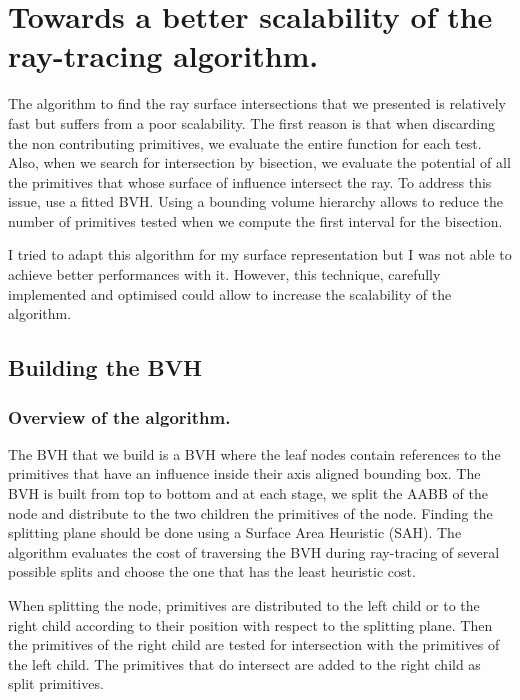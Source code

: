 \documentclass[11pt,a4paper,english]{article}
\begin{document}
\newpage

\appendix
\section{Towards a better scalability of the ray-tracing algorithm.}

The algorithm to find the ray surface intersections that we presented is relatively fast but suffers from a poor scalability.
The first reason is that when discarding the non contributing primitives, we evaluate the entire function for each test.
Also, when we search for intersection by bisection, we evaluate the potential of all the primitives that whose surface of influence intersect the ray. To address this issue, \cite{Gourmel-2010-FBVH} use a fitted BVH. Using a bounding volume hierarchy allows to reduce the number of primitives tested when we compute the first interval for the bisection.

I tried to adapt this algorithm for my surface representation but I was not able to achieve better performances with it. However, this technique, carefully implemented and optimised could allow to increase the scalability of the algorithm. 

\subsection{Building the BVH}

\subsubsection{Overview of the algorithm.}

The BVH that we build is a BVH where the leaf nodes contain references to the primitives that have an influence inside their axis aligned bounding box. The BVH is built from top to bottom and at each stage, we split the AABB of the node and distribute to the two children the primitives of the node. Finding the splitting plane should be done using a Surface Area Heuristic (SAH).
The algorithm evaluates the cost of traversing the BVH during ray-tracing of several possible splits and choose the one that has the least heuristic cost.

When splitting the node, primitives are distributed to the left child or to the right child according to their position with respect to the splitting plane. Then the primitives of the right child are tested for intersection with the primitives of the left child. The primitives that do intersect are added to the right child as split primitives. 
\end{document}
